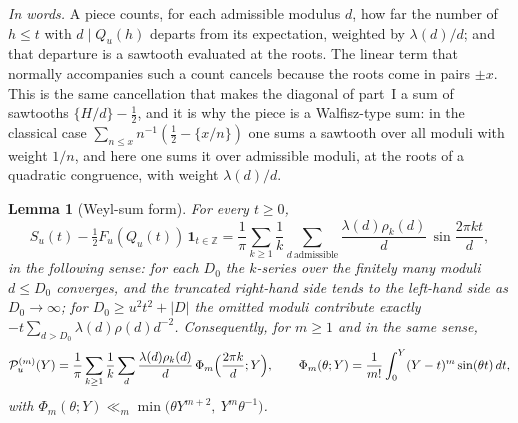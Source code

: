 \documentclass[11pt,a4paper]{article}
\newtheorem{lemma}[theorem]{Lemma}
\theoremstyle{remark}\newtheorem{remark}[theorem]{Remark}
\newcommand{\Z}{\mathbb Z}\newcommand{\R}{\mathbb R}\newcommand{\Q}{\mathbb Q}\newcommand{\C}{\mathbb C}
\begin{document}
\emph{In words.} A piece counts, for each admissible modulus $d$, how far the number of $h\le t$ with $d\mid Q_u(h)$
departs from its expectation, weighted by $\lambda(d)/d$; and that departure is a sawtooth evaluated at the roots.
The linear term that normally accompanies such a count cancels because the roots come in pairs $\pm x$. This is the
same cancellation that makes the diagonal of part~I a sum of sawtooths $\{H/d\}-\tfrac12$, and it is why the piece is
a Walfisz-type sum: in the classical case $\sum_{n\le x}n^{-1}(\tfrac12-\{x/n\})$ one sums a sawtooth over all moduli
with weight $1/n$, and here one sums it over admissible moduli, at the roots of a quadratic congruence, with weight
$\lambda(d)/d$.

\begin{lemma}[Weyl-sum form]\label{lem:weyl}
For every $t\ge0$,
\begin{equation}\label{eq:weylform}
S_u(t)-\tfrac12F_u(Q_u(t))\,\mathbf 1_{t\in\Z}=\frac1\pi\sum_{k\ge1}\frac1k\sum_{d\ \mathrm{admissible}}\frac{\lambda(d)\rho_k(d)}{d}\,\sin\frac{2\pi kt}d ,
\end{equation}
in the following sense: for each $D_0$ the $k$-series over the finitely many moduli $d\le D_0$ converges, and the
truncated right-hand side tends to the left-hand side as $D_0\to\infty$; for $D_0\ge u^2t^2+|D|$ the omitted moduli
contribute exactly $-t\sum_{d>D_0}\lambda(d)\rho(d)d^{-2}$. Consequently, for $m\ge1$ and in the same sense,
\begin{equation}\label{eq:rieszweyl}
\mathcal P^{(m)}_u(Y)=\frac1\pi\sum_{k\ge1}\frac1k\sum_{d}\frac{\lambda(d)\rho_k(d)}{d}\,\Phi_m\Bigl(\frac{2\pi k}d;Y\Bigr),
\qquad \Phi_m(\theta;Y)=\frac1{m!}\int_0^Y(Y-t)^m\sin(\theta t)\,dt,
\end{equation}
with $\Phi_m(\theta;Y)\ll_m\min\bigl(\theta Y^{m+2},\ Y^{m}\theta^{-1}\bigr)$.
\end{lemma}
\end{document}
